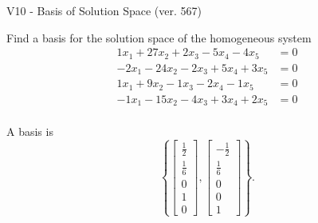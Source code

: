 \begin{exercise}
  \begin{exerciseTitle}V10 - Basis of Solution Space (ver. 567)\end{exerciseTitle}
  \begin{exerciseStatement}
    Find a basis for the solution space of the homogeneous system 
\begin{align*}
 1 x_ 1 + 27 x_ 2 + 2 x_ 3 -5 x_ 4 -4 x_ 5 &= 0  \\ 
  -2 x_ 1 -24 x_ 2 -2 x_ 3 + 5 x_ 4 + 3 x_ 5 &= 0  \\ 
  1 x_ 1 + 9 x_ 2 -1 x_ 3 -2 x_ 4 -1 x_ 5 &= 0  \\ 
  -1 x_ 1 -15 x_ 2 -4 x_ 3 + 3 x_ 4 + 2 x_ 5 &= 0  \\ 
 \end{align*}


 
  \end{exerciseStatement}

  \begin{exerciseAnswer}
   A basis is   
\[\left\{\left[\begin{array}{c}
\frac{1}{2} \\
\frac{1}{6} \\
0 \\
1 \\
0
\end{array}\right] , \left[\begin{array}{c}
-\frac{1}{2} \\
\frac{1}{6} \\
0 \\
0 \\
1
\end{array}\right]\right\}.\]

  


  \end{exerciseAnswer}
\end{exercise}